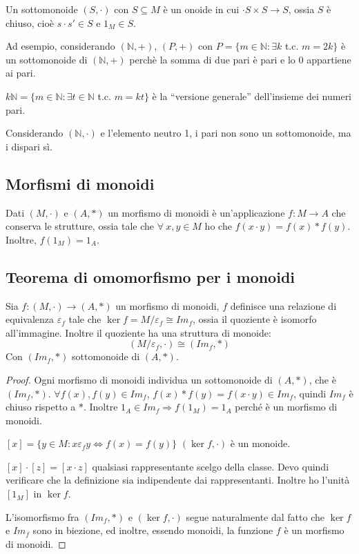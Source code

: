 Un sottomonoide $(S, \cdot)$ con $S \subseteq M$ \`e un onoide in cui $\cdot S \times S \to S$, ossia $S$ \`e chiuso, cio\`e $s \cdot s' \in S$ e $1_M \in S$.

Ad esempio, considerando $(\mathbb{N}, +)$, $(P, +)$ con $P = \{ m \in \mathbb{N} : \exists k $ t.c. $m = 2k \}$ \`e un sottomonoide di $(\mathbb{N},+)$ perch\`e la somma di due pari \`e pari e lo 0 appartiene ai pari.

$k \mathbb{N} = \{ m \in \mathbb{N} : \exists t \in \mathbb{N} $ t.c. $ m = k t\}$ \`e la ``versione generale'' dell'insieme dei numeri pari.

Considerando $(\mathbb{N}, \cdot)$ e l'elemento neutro 1, i pari non sono un sottomonoide, ma i dispari s\`i.

\subsection{Morfismi di monoidi}

\begin{defn}
Dati $(M, \cdot)$ e $(A, \ast)$ un morfismo di monoidi \`e un'applicazione $f : M \to A$ che conserva le strutture, ossia tale che $\forall \ x,y \in M $ ho che $f(x \cdot y) = f(x) \ast f(y)$. Inoltre, $f(1_M) = 1_A$.
\end{defn}

\subsection{Teorema di omomorfismo per i monoidi}

\begin{prop}
Sia $f : (M, \cdot) \to (A, \ast)$ un morfismo di monoidi, $f$ definisce una relazione di equivalenza $\varepsilon_f$ tale che $\ker f = M / \varepsilon_f \cong Im_f$, ossia il quoziente \`e isomorfo all'immagine. Inoltre il quoziente ha una struttura di monoide:
\[
(M / \varepsilon_f , \cdot) \cong (Im_f, \ast)
\]
Con $(Im_f, \ast)$ sottomonoide di $(A, \ast)$.
\end{prop}
\begin{proof}
Ogni morfismo di monoidi individua un sottomonoide di $(A, \ast)$, che \`e $(Im_f, \ast)$. $\forall f(x), f(y) \in Im_f$, $f(x) \ast f(y) = f(x \cdot y) \in Im_f$, quindi $Im_f $ \`e chiuso rispetto a $\ast$. Inoltre $1_A \in Im_f \Rightarrow f(1_M) = 1_A$ perch\'e \`e un morfismo di monoidi.

$[x] = \{ y \in M : x \varepsilon_f y \Leftrightarrow f(x) = f(y) \}$ $(\ker f, \cdot)$ \`e un monoide.

$[x] \cdot [z] = [x \cdot z]$ qualsiasi rappresentante scelgo della classe. Devo quindi verificare che la definizione sia indipendente dai rappresentanti. Inoltre ho l'unit\`a $[1_M]$ in $\ker f$.

L'isomorfismo fra $(Im_f, \ast)$ e $(\ker f, \cdot)$ segue naturalmente dal fatto che $\ker f $ e $Im_f$ sono in biezione, ed inoltre, essendo monoidi, la funzione $f$ \`e un morfismo di monoidi.
\end{proof}

